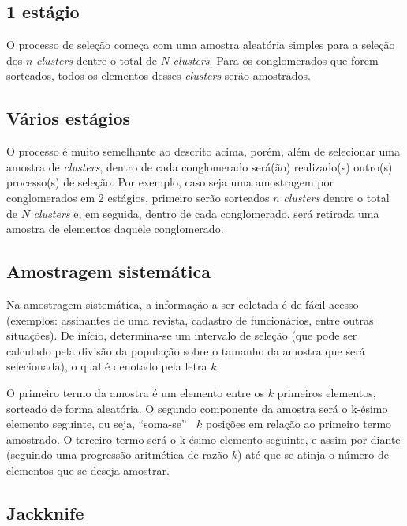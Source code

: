 \documentclass[
  portuguese,
]{estat/estat}
\begin{document}
\subsection{1 estágio}\label{estuxe1gio}

O processo de seleção começa com uma amostra aleatória simples para a
seleção dos \(n\) \emph{clusters} dentre o total de \(N\)
\emph{clusters}. Para os conglomerados que forem sorteados, todos os
elementos desses \emph{clusters} serão amostrados.

\subsection{Vários estágios}\label{vuxe1rios-estuxe1gios}

O processo é muito semelhante ao descrito acima, porém, além de
selecionar uma amostra de \emph{clusters}, dentro de cada conglomerado
será(ão) realizado(s) outro(s) processo(s) de seleção. Por exemplo, caso
seja uma amostragem por conglomerados em 2 estágios, primeiro serão
sorteados \(n\) \emph{clusters} dentre o total de \(N\) \emph{clusters}
e, em seguida, dentro de cada conglomerado, será retirada uma amostra de
elementos daquele conglomerado.

\subsection{Amostragem sistemática}\label{amostragem-sistemuxe1tica}

Na amostragem sistemática, a informação a ser coletada é de fácil acesso
(exemplos: assinantes de uma revista, cadastro de funcionários, entre
outras situações). De início, determina-se um intervalo de seleção (que
pode ser calculado pela divisão da população sobre o tamanho da amostra
que será selecionada), o qual é denotado pela letra \(k\).

O primeiro termo da amostra é um elemento entre os \(k\) primeiros
elementos, sorteado de forma aleatória. O segundo componente da amostra
será o k-ésimo elemento seguinte, ou seja, ``soma-se'' \(\:\) \(k\)
posições em relação ao primeiro termo amostrado. O terceiro termo será o
k-ésimo elemento seguinte, e assim por diante (seguindo uma progressão
aritmética de razão \(k\)) até que se atinja o número de elementos que
se deseja amostrar.

\subsection{Jackknife}\label{jackknife}
\end{document}
